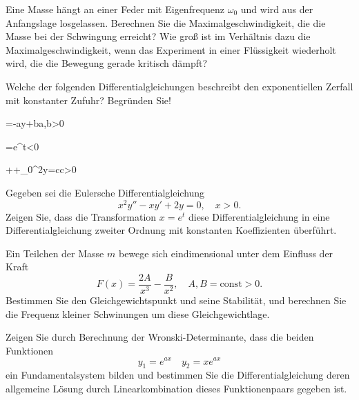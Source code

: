 \begin{atiTask}[
	title = Weitere Fragen,
	language = Deutsch
]
	\begin{atiSubtasks}
	\item 
	Eine Masse hängt an einer Feder mit Eigenfrequenz $\omega_0$ und wird aus der Anfangslage losgelassen. Berechnen Sie die Maximalgeschwindigkeit, die die Masse bei der Schwingung erreicht? Wie groß ist im Verhältnis dazu die Maximalgeschwindigkeit, wenn das Experiment in einer Flüssigkeit wiederholt wird, die die Bewegung gerade kritisch dämpft?
	
	\item Welche der folgenden Differentialgleichungen beschreibt den exponentiellen Zerfall mit konstanter Zufuhr? Begründen Sie!
	\begin{atiSubequations}
	\item {=-ay+b\quad a,b>0}
	\item {=e^{\alpha t}\quad \alpha<0}
	\item {+\gamma {}+\omega_0^2y=c\quad c>0}
	\end{atiSubequations} 
	\item Gegeben sei die Eulersche Differentialgleichung
	\begin{equation*}
	x^2y''-xy'+2y=0,\quad x>0.
	\end{equation*}
	Zeigen Sie, dass die Transformation $x=e^t$ diese Differentialgleichung in eine Differentialgleichung zweiter Ordnung mit konstanten Koeffizienten überführt.
	\item Ein Teilchen der Masse $m$ bewege sich eindimensional unter dem Einfluss der Kraft
	\begin{equation*}
	F(x)=\frac{2A}{x^3}-\frac{B}{x^2},\quad A,B=\text{const}>0.
	\end{equation*}
	Bestimmen Sie den Gleichgewichtspunkt und seine Stabilität, und berechnen Sie die Frequenz kleiner Schwinungen um diese Gleichgewichtlage.
	\item Zeigen Sie durch Berechnung der Wronski-Determinante, dass die beiden Funktionen
	\begin{equation*}
	y_1=e^{ax}\quad y_2=xe^{ax}
	\end{equation*}
	ein Fundamentalsystem bilden und bestimmen Sie die Differentialgleichung deren allgemeine Lösung durch Linearkombination dieses Funktionenpaars gegeben ist.
	\end{atiSubtasks}
\end{atiTask}
